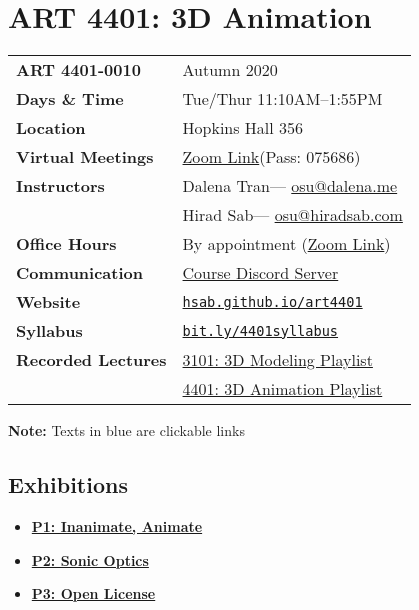 \documentclass[10pt,letter,english]{article}
\makeatletter
\providecommand{\tightlist}{%
      \setlength{\itemsep}{0pt}\setlength{\parskip}{0pt}%
}
\def\courseCode{ART 4401}
\def\courseTitle{ART 4401: 3D Animation}
\def\courseNumber{ART 4401-0010}
\def\courseSemester{Autumn 2020}
\def\courseTime{Tue/Thur 11:10AM--1:55PM}
\def\courseLocation{Hopkins Hall 356}
\def\dalena{Dalena Tran}
\def\dalenaURL{osu@dalena.me}
\def\dalenaEmail{\href{mailto:\dalenaURL}{{\dalenaURL}}}
\def\hirad{Hirad Sab}
\def\hiradURL{osu@hiradsab.com}
\def\hiradEmail{\href{mailto:\hiradURL}{{\hiradURL}}}
\def\zoomURL{https://osu.zoom.us/j/92337296593?pwd=ZUFScERqWkFBcEFrcXNDR053QnFSUT09}
\def\zoomText{\href{\zoomURL}{{Zoom Link}}}
\def\discordURL{https://discord.gg/SDQJkA6}
\def\discordText{\href{\discordURL}{{Course Discord Server}}}
\def\syllabusURL{https://github.com/hsab/art4401/raw/master/index.pdf}
\def\syllabusDownloadText{\href{\syllabusURL}{\small{\texttt{bit.ly/4401syllabus}}}}
\def\websiteURL{https://hsab.github.io/art4401/}
\def\websiteText{\href{\websiteURL}{\small{\texttt{hsab.github.io/art4401}}}}
\def\youtubeModelingURL{https://www.youtube.com/playlist?list=PLY3eFbxnBXhoeFgmblP2M7YzJO76jzAf6}
\def\youtubeModelingText{\href{\youtubeModelingURL}{3101: 3D Modeling Playlist}}
\def\youtubeAnimURL{https://www.youtube.com/playlist?list=PLY3eFbxnBXhraIJ0bSdXZNrunWyYGMyrx}
\def\youtubeAnimText{\href{\youtubeAnimURL}{4401: 3D Animation Playlist}}
\makeatother
\begin{document}
\section[\courseCode]{\courseTitle}

\begin{tabularx}{\textwidth}{@{}l X@{}}
      \textbf{\courseNumber}     & \courseSemester            \\
      \textbf{Days \& Time}      & \courseTime                \\
      \textbf{Location}          & \courseLocation            \\
      \textbf{Virtual Meetings}  & \zoomText (Pass: 075686)                  \\
      \textbf{Instructors}       & \dalena --- \dalenaEmail   \\
                                 & \hirad --- \hiradEmail     \\
      \textbf{Office Hours}      & By appointment (\zoomText) \\
      \textbf{Communication}     & \discordText               \\
      \textbf{Website}           & \websiteText               \\
      \textbf{Syllabus}          & \syllabusDownloadText      \\
      \textbf{Recorded Lectures} & \youtubeModelingText       \\
                                 & \youtubeAnimText           \\
\end{tabularx}

\small{\textbf{Note:} Texts in \textcolor{defaultColor}{blue} are clickable links}

\subsection*{Exhibitions}

\begin{itemize}
      \tightlist
      \item {\large \textbf{\href{https://hsab.github.io/art4401/projects/p1/index.html}{P1: Inanimate, Animate}}}
      \item {\large \textbf{\href{https://hsab.github.io/art4401/projects/p2/index.html}{P2: Sonic Optics}}}
      \item {\large \textbf{\href{https://hsab.github.io/art4401/projects/p3/index.html}{P3: Open License}}}
\end{itemize}



\clearpage



\clearpage



\clearpage



\clearpage


\end{document}
